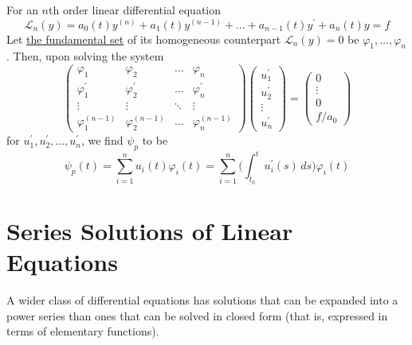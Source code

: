\documentclass{article}
\newcounter{theorem}[section]
\begin{document}
      \begin{theorem}
        \label{thm:variation-of-constants-formula}
      For an $n$th order linear differential equation 
      \begin{equation}
        \mathcal{L}_n (y) = a_0 (t) y^{(n)} + a_1 (t) y^{(n-1)} + \ldots + a_{n-1} (t) y^\prime + a_n (t) y = f
      \end{equation}
      Let \hyperref[thm:the-fundamental-set]{the fundamental set} of its homogeneous counterpart $\mathcal{L}_n (y) = 0$ be $\varphi_1, \ldots, \varphi_n$. Then, upon solving the system 
      \begin{equation}
        \begin{pmatrix}
              \varphi_1 & \varphi_2 & \ldots & \varphi_n \\
              \varphi_1^\prime & \varphi_2^\prime & \ldots & \varphi_n^\prime\\
              \vdots & \vdots & \ddots & \vdots \\
              \varphi_1^{(n-1)} & \varphi_2^{(n-1)} & \ldots & \varphi_n^{(n-1)}
              \end{pmatrix} \begin{pmatrix}
              u_1^\prime \\ u_2^\prime \\ \vdots \\ u_n^\prime
              \end{pmatrix} = \begin{pmatrix}
              0 \\ \vdots \\ 0 \\ f / a_0
              \end{pmatrix}
      \end{equation}
      for $u_1^\prime, u_2^\prime, \ldots, u_n^\prime$, we find $\psi_p$ to be
      \begin{equation}
        \psi_p (t) = \sum_{i=1}^n u_i (t) \varphi_i(t) = \sum_{i=1}^n \Big( \int_{t_0}^t u_i^\prime (s)\,ds \Big) \varphi_i (t)
      \end{equation}
      \end{theorem}

\section{Series Solutions of Linear Equations}

  A wider class of differential equations has solutions that can be expanded into a power series than ones that can be solved in closed form (that is, expressed in terms of elementary functions). 
\end{document}

